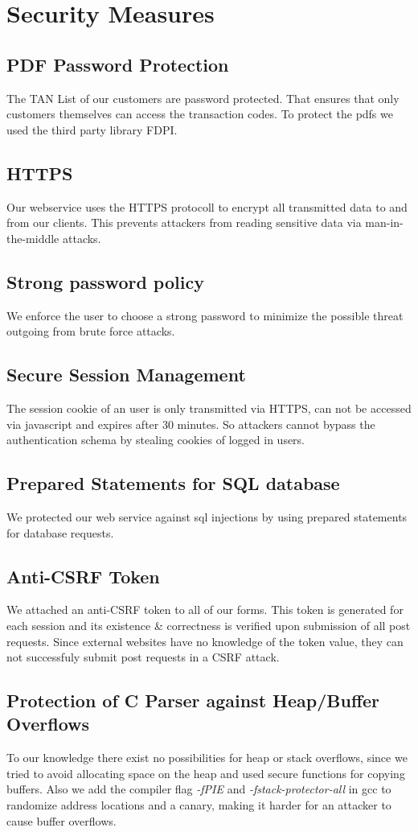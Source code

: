 \chapter{Security Measures}

\section{PDF Password Protection}
The TAN List of our customers are password protected. That ensures that only customers themselves can access the transaction codes. To protect the pdfs we used the third party library FDPI.
\section{HTTPS}
Our webservice uses the HTTPS protocoll to encrypt all transmitted data to and from our clients.
This prevents attackers from reading sensitive data via man-in-the-middle attacks.
\section{Strong password policy}
We enforce the user to choose a strong password to minimize the possible threat outgoing from brute force attacks.
\section{Secure Session Management}
The session cookie of an user is only transmitted via HTTPS, can not be accessed via javascript and expires after 30 minutes. So attackers cannot bypass the authentication schema by stealing cookies of logged in users.
\section{Prepared Statements for SQL database}
We protected our web service against sql injections by using prepared statements for database requests.
\section{Anti-CSRF Token}
We attached an anti-CSRF token to all of our forms. This token is generated for each session and its existence \& correctness is verified upon submission of all post requests. Since external websites have no knowledge of the token value, they can not successfuly submit post requests in a CSRF attack.
\section{Protection of C Parser against Heap/Buffer Overflows}
To our knowledge there exist no possibilities for heap or stack overflows, since we tried to avoid allocating space on the heap and used secure functions for copying buffers. Also we add the compiler flag \textit{-fPIE} and \textit{-fstack-protector-all} in gcc to randomize address locations and a canary, making it harder for an attacker to cause buffer overflows.
